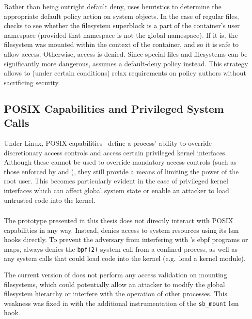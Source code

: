 Rather than being outright default deny, \bpfcontain{} uses heuristics to determine the
appropriate default policy action on system objects. In the case of regular files,
\bpfcontain{} checks to see whether the filesystem superblock is a part of the container's
user namespace (provided that namespace is not the global namespace). If it is, the
filesystem was mounted within the context of the container, and so it is safe to allow
access. Otherwise, access is denied. Since special files and filesystems can be
significantly more dangerous, \bpfcontain{} assumes a default-deny policy instead. This
strategy allows \bpfcontain{} to (under certain conditions) relax requirements on policy
authors without sacrificing security.

\subsection{POSIX Capabilities and Privileged System Calls}

Under Linux, POSIX capabilities~\cite{posix_capabilities} define a process' ability to
override discretionary access controls and access certain privileged kernel interfaces.
Although these cannot be used to override mandatory access controls (such as those
enforced by \bpfbox{} and \bpfcontain{}), they still provide a means of limiting the power
of the root user. This becomes particularly evident in the case of privileged kernel
interfaces which can affect global system state or enable an attacker to load untrusted
code into the kernel.

\subsubsection{\bpfbox{}}

The \bpfbox{} prototype presented in this thesis does not directly interact with POSIX
capabilities in any way. Instead, \bpfbox{} denies access to system resources using its
\gls{lsm} hooks directly. To prevent the adversary from interfering with \bpfbox{}'s
\gls{ebpf} programs or maps, \bpfbox{} always denies the \texttt{bpf(2)} system call from
a confined process, as well as any system calls that could load code into the kernel
(e.g.\ load a kernel module).

The current version of \bpfbox{} does not perform any access validation on mounting
filesystems, which could potentially allow an attacker to modify the global filesystem
hierarchy or interfere with the operation of other processes. This weakness was fixed in
\bpfcontain{} with the additional instrumentation of the \texttt{sb\_mount} \gls{lsm}
hook.

